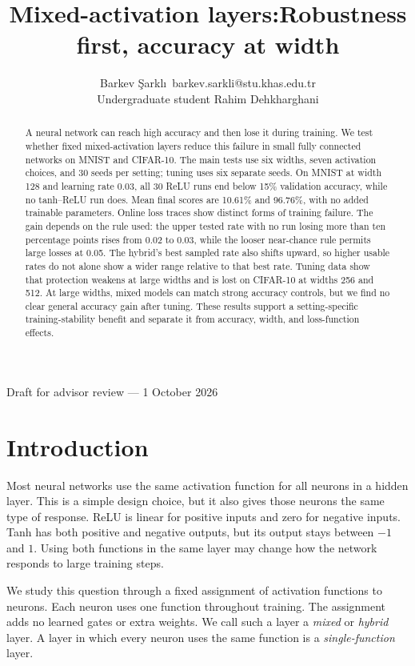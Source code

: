 \documentclass[10pt]{article}
\title{Mixed-activation layers:\newline Robustness first, accuracy at width}
\author{\name Barkev \c{S}arkl\i\ \email barkev.sarkli@stu.khas.edu.tr\\
\addr Undergraduate student
\AND
\name Rahim Dehkharghani}
\begin{document}
\maketitle
\begin{center}\small Draft for advisor review --- 1 October 2026\end{center}

\begin{abstract}
A neural network can reach high accuracy and then lose it during training. We test whether fixed mixed-activation layers reduce this failure in small fully connected networks on MNIST and CIFAR-10. The main tests use six widths, seven activation choices, and 30 seeds per setting; tuning uses six separate seeds. On MNIST at width 128 and learning rate 0.03, all 30 ReLU runs end below 15\% validation accuracy, while no tanh--ReLU run does. Mean final scores are 10.61\% and 96.76\%, with no added trainable parameters. Online loss traces show distinct forms of training failure. The gain depends on the rule used: the upper tested rate with no run losing more than ten percentage points rises from 0.02 to 0.03, while the looser near-chance rule permits large losses at 0.05. The hybrid's best sampled rate also shifts upward, so higher usable rates do not alone show a wider range relative to that best rate. Tuning data show that protection weakens at large widths and is lost on CIFAR-10 at widths 256 and 512. At large widths, mixed models can match strong accuracy controls, but we find no clear general accuracy gain after tuning. These results support a setting-specific training-stability benefit and separate it from accuracy, width, and loss-function effects.
\end{abstract}

\section{Introduction}
Most neural networks use the same activation function for all neurons in a hidden layer. This is a simple design choice, but it also gives those neurons the same type of response. ReLU is linear for positive inputs and zero for negative inputs. Tanh has both positive and negative outputs, but its output stays between $-1$ and $1$. Using both functions in the same layer may change how the network responds to large training steps.

We study this question through a fixed assignment of activation functions to neurons. Each neuron uses one function throughout training. The assignment adds no learned gates or extra weights. We call such a layer a \emph{mixed} or \emph{hybrid} layer. A layer in which every neuron uses the same function is a \emph{single-function} layer.
\end{document}

